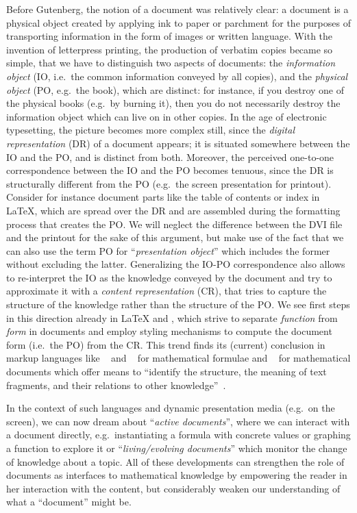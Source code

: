 \documentclass[pdftex,bibtotocnumbered,idxtotoc,11pt]{scrartcl}
\begin{document}
Before Gutenberg, the notion of a document was relatively clear: a document is a physical
object created by applying ink to paper or parchment for the purposes of transporting
information in the form of images or written language. With the invention of letterpress
printing, the production of verbatim copies became so simple, that we have to distinguish
two aspects of documents: the {\emph{information object}} (IO, i.e.\ the common
information conveyed by all copies), and the {\emph{physical object}} (PO, e.g.\ the
book), which are distinct: for instance, if you destroy one of the physical books (e.g.\
by burning it), then you do not necessarily destroy the information object which can live
on in other copies. In the age of electronic typesetting, the picture becomes more complex
still, since the {\emph{digital representation}} (DR) of a document appears; it is
situated somewhere between the IO and the PO, and is distinct from both. Moreover, the
perceived one-to-one correspondence between the IO and the PO becomes tenuous, since the
DR is structurally different from the PO (e.g.\ the screen presentation for printout).
Consider for instance document parts like the table of contents or index in {\LaTeX},
which are spread over the DR and are assembled during the formatting process that creates
the PO. We will neglect the difference between the DVI file and the printout for the sake
of this argument, but make use of the fact that we can also use the term PO for
``{\emph{presentation object}}'' which includes the former without excluding the
latter. Generalizing the IO-PO correspondence also allows to re-interpret the IO as the
knowledge conveyed by the document and try to approximate it with a {\emph{content
    representation}} (CR), that tries to capture the structure of the knowledge rather
than the structure of the PO. We see first steps in this direction already in {\LaTeX} and
{\sc{sgml}}, which strive to separate {\emph{function}} from {\emph{form}} in documents
and employ styling mechanisms to compute the document form (i.e.\ the PO) from the
CR. This trend finds its (current) conclusion in markup languages like
{\openmath}~\cite{BusCapCar:2oms04} and {\mathml}~\cite{CarIon:MathML03} for mathematical
formulae and {\omdoc}~\cite{Kohlhase:omdoc1.2} for mathematical documents which offer
means to ``identify the structure, the meaning of text fragments, and their relations to
other knowledge''~\cite{Kohlhase:omdoc1.2}.

In the context of such languages and dynamic presentation media (e.g.\ on the screen), we
can now dream about ``{\emph{active documents}}'', where we can interact with a document
directly, e.g.\ instantiating a formula with concrete values or graphing a function to
explore it or ``{\emph{living/evolving documents}}'' which monitor the change of knowledge
about a topic. All of these developments can strengthen the role of documents as
interfaces to mathematical knowledge by empowering the reader in her interaction with the
content, but considerably weaken our understanding of what a ``document'' might be.
\end{document}
